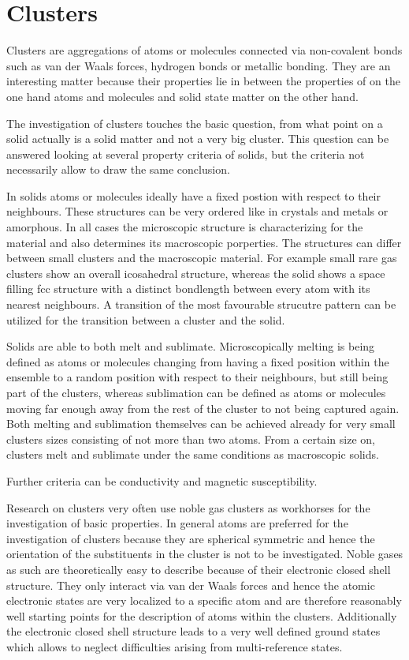 \section{Clusters}

Clusters are aggregations of atoms or molecules connected via non-covalent
bonds such as van der Waals forces, hydrogen bonds or metallic bonding.
They are an interesting
matter because their properties lie in between the properties of on the one hand
atoms and molecules and solid state matter on the other hand.

The investigation of clusters touches the basic question, from what point
on a solid actually is a solid matter and not a very big cluster.
This question can be answered looking at several property criteria of solids,
but the criteria not necessarily allow to draw the same conclusion.

In solids atoms or molecules ideally have a fixed postion with respect to their
neighbours. These structures can be very ordered like in crystals and metals
or amorphous. In all cases the microscopic structure is characterizing for
the material and also determines its macroscopic
porperties.
The structures can differ between small clusters and the macroscopic
material. For example small rare gas clusters show an overall icosahedral
structure, whereas the solid shows a space filling fcc structure with
a distinct bondlength between every atom with its nearest neighbours.
A transition of the most favourable strucutre pattern can be utilized
for the transition between a cluster and the solid.

Solids are able to both melt and sublimate. Microscopically melting
is being defined as atoms or
molecules changing from having a fixed position within the ensemble to a
random position with respect to their neighbours, but still being part
of the clusters, whereas sublimation can be defined as atoms or molecules
moving far enough away from the rest of the cluster to not being captured
again.
Both melting and sublimation themselves can be achieved already for very
small clusters
sizes consisting of not more than two atoms. From a certain size on,
clusters melt and sublimate under the same conditions as macroscopic
solids.

Further criteria can be conductivity and magnetic susceptibility.

Research on clusters very often use noble gas clusters as workhorses for
the investigation of basic properties.
In general atoms are preferred for the investigation of clusters because
they are spherical symmetric and hence the orientation of the substituents
in the cluster is not to be investigated.
Noble gases as such are theoretically easy to describe because of their
electronic closed shell structure.
They only interact via
van der Waals forces and hence the atomic electronic states are very
localized to a specific atom and are therefore
reasonably well starting points for the description of atoms within the
clusters. 
Additionally the electronic closed shell structure leads to a very well
defined ground states which allows to neglect difficulties arising from
multi-reference states.

